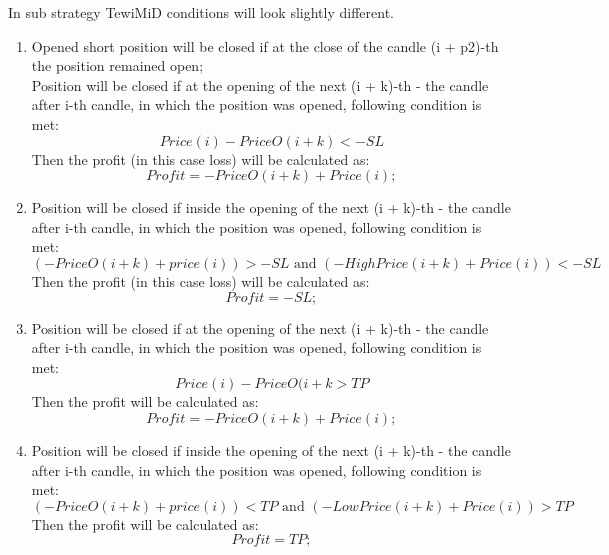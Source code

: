 \documentclass{tewiart}
\begin{document}
In sub strategy TewiMiD conditions will look slightly different.
\begin{enumerate}
\item Opened short position will be closed if at the close of the candle (i + p2)-th the position remained open;\\
Position will be closed if at the opening of the next (i + k)-th - the candle after i-th candle, in which the position was opened, following condition is met:
\begin{equation}
Price(i)-PriceO(i+k)<-SL
\end{equation}                                      
Then the profit (in this case loss) will be calculated as:
\begin{equation}
Profit =-PriceO (i+k) +  Price(i) ;
\end{equation}

\item Position will be closed if inside the opening of the next (i + k)-th - the candle after i-th candle, in which the position was opened, following condition is met:
\begin{equation}
(-PriceO (i+k)+price(i) )>-SL \text{ and } (-HighPrice(i+k)+Price(i))<-SL
\end{equation}                          
Then the profit (in this case loss) will be calculated as:
\begin{equation}
Profit =-SL; 
\end{equation}

\item Position will be closed if at the opening of the next (i + k)-th - the candle after i-th candle, in which the position was opened, following condition is met:
\begin{equation}
Price(i)-PriceO(i+k>TP
\end{equation}                                           
Then the profit will be calculated as:
\begin{equation}
Profit =-PriceO (i+k)  + Price(i) ;
\end{equation} 


\item Position will be closed if inside the opening of the next (i + k)-th - the candle after i-th candle, in which the position was opened, following condition is met: 
\begin{equation}
(-PriceO(i+k)+price(i) )<TP \text{ and } (-LowPrice(i+k)+Price(i))>TP
\end{equation}
Then the profit will be calculated as:
\begin{equation}
Profit =TP; 
\end{equation}


\end{enumerate}
\end{document}
